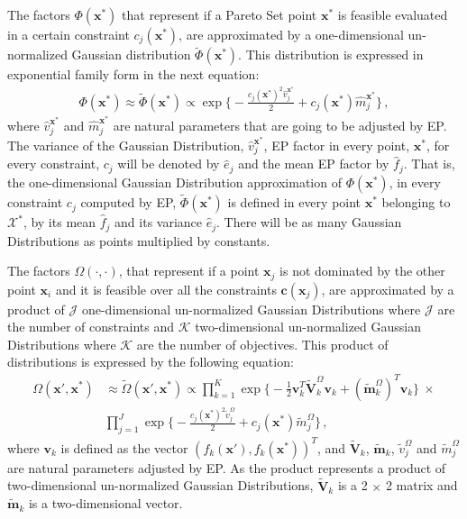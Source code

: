 The factors $\Phi(\boldsymbol{x}^*)$ that represent if a Pareto Set point $\boldsymbol{x}^*$ is feasible evaluated in a certain constraint $c_j(\boldsymbol{x}^*)$, are approximated by a one-dimensional un-normalized Gaussian distribution $\tilde{\Phi}(\boldsymbol{x}^*)$. This distribution is expressed in exponential family form in the next equation:
\begin{align}
    \Phi(\boldsymbol{x}^*) \approx \tilde{\Phi}(\boldsymbol{x}^*) \propto \exp\bigg\{ - \frac{c_j(\boldsymbol{x}^{*})^{2}\hat{v}_{j}^{\boldsymbol{x}^{*}}}{2} + c_j(\boldsymbol{x}^*)\hat{m}_{j}^{\boldsymbol{x}^*}\bigg\}\,,
\end{align}
where $\hat{v}_{j}^{\boldsymbol{x}^{*}}$ and $\hat{m}_{j}^{\boldsymbol{x}^*}$ are natural parameters that are going to be adjusted by EP. The variance of the Gaussian Distribution, $\hat{v}_{j}^{\boldsymbol{x}^{*}}$, EP factor in every point, $\boldsymbol{x}^*$, for every constraint, $c_j$ will be denoted by $\hat{e}_{j}$ and the mean EP factor by $\hat{f}_{j}$. That is, the one-dimensional Gaussian Distribution approximation of ${\Phi}(\boldsymbol{x}^*)$, in every constraint $c_j$ computed by EP, $\tilde{\Phi}(\boldsymbol{x}^*)$ is defined in every point $\boldsymbol{x}^*$ belonging to $\mathcal{X}^*$, by its mean $\hat{f}_{j}$ and its variance $\hat{e}_{j}$. There will be as many Gaussian Distributions as points multiplied by constants.

The factors $\Omega(\cdot,\cdot)$, that represent if a point $\boldsymbol{x}_j$ is not dominated by the other point $\boldsymbol{x}_i$ and it is feasible over all the constraints $\boldsymbol{c}(\boldsymbol{x}_j)$, are approximated by a product of $\mathcal{J}$ one-dimensional un-normalized Gaussian Distributions where $\mathcal{J}$ are the number of constraints and $\mathcal{K}$ two-dimensional un-normalized Gaussian Distributions where $\mathcal{K}$ are the number of objectives. This product of distributions is expressed by the following equation:
\begin{align}
\Omega(\boldsymbol{x}',\boldsymbol{x}^*) & \approx \tilde{\Omega}(\boldsymbol{x}',\boldsymbol{x}^*) \propto \prod_{k=1}^{K}\exp\bigg\{-\frac{1}{2}\boldsymbol{v}_{k}^{T}\tilde{\boldsymbol{V}}_{k}^{\Omega}\boldsymbol{v}_k + (\tilde{\boldsymbol{m}}_{k}^{\Omega})^{T}\boldsymbol{v}_k\bigg\} \  \times \nonumber \\ & \prod_{j=1}^{J} \exp \bigg\{ - \frac{c_j(\boldsymbol{x}^*)^2\tilde{v}_j^{\Omega}}{2} + c_j(\boldsymbol{x}^*)\tilde{m}_j^{\Omega} \bigg\}\,,
\end{align}
where $\boldsymbol{v}_k$ is defined as the vector $(f_k(\boldsymbol{x}'),f_k(\boldsymbol{x}^*))^T$, and $\tilde{\boldsymbol{V}}_{k}$, $\tilde{\boldsymbol{m}}_{k}$, $\tilde{v}_j^{\Omega}$ and $\tilde{m}_j^{\Omega}$ are natural parameters adjusted by EP. As the product represents a product of two-dimensional un-normalized Gaussian Distributions, $\tilde{\boldsymbol{V}}_{k}$ is a 2 $\times$ 2 matrix and $\tilde{\boldsymbol{m}}_{k}$ is a two-dimensional vector.

